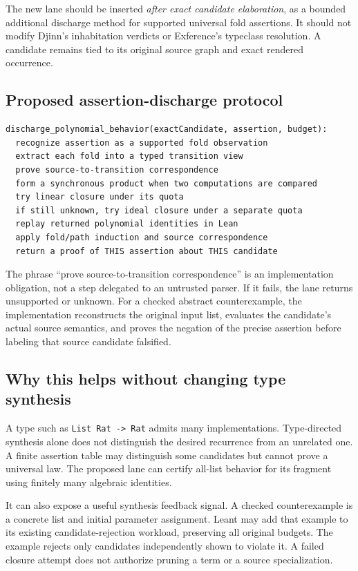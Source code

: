 \documentclass[11pt,letterpaper]{article}
\theoremstyle{definition}
\newcommand{\code}[1]{\nolinkurl{#1}}
\begin{document}
The new lane should be inserted \emph{after exact candidate elaboration}, as a
bounded additional discharge method for supported universal fold assertions.
It should not modify Djinn's inhabitation verdicts or Exference's typeclass
resolution. A candidate remains tied to its original source graph and exact
rendered occurrence.

\subsection{Proposed assertion-discharge protocol}
\begin{lstlisting}
discharge_polynomial_behavior(exactCandidate, assertion, budget):
  recognize assertion as a supported fold observation
  extract each fold into a typed transition view
  prove source-to-transition correspondence
  form a synchronous product when two computations are compared
  try linear closure under its quota
  if still unknown, try ideal closure under a separate quota
  replay returned polynomial identities in Lean
  apply fold/path induction and source correspondence
  return a proof of THIS assertion about THIS candidate
\end{lstlisting}

The phrase ``prove source-to-transition correspondence'' is an implementation
obligation, not a step delegated to an untrusted parser. If it fails, the lane
returns unsupported or unknown. For a checked abstract counterexample, the
implementation reconstructs the original input list, evaluates the candidate's
actual source semantics, and proves the negation of the precise assertion
before labeling that source candidate falsified.

\subsection{Why this helps without changing type synthesis}
A type such as \code{List Rat -> Rat} admits many implementations. Type-directed
synthesis alone does not distinguish the desired recurrence from an unrelated
one. A finite assertion table may distinguish some candidates but cannot prove
a universal law. The proposed lane can certify all-list behavior for its
fragment using finitely many algebraic identities.

It can also expose a useful synthesis feedback signal. A checked counterexample
is a concrete list and initial parameter assignment. Leant may add that example
to its existing candidate-rejection workload, preserving all original budgets.
The example rejects only candidates independently shown to violate it. A failed
closure attempt does not authorize pruning a term or a source specialization.
\end{document}
